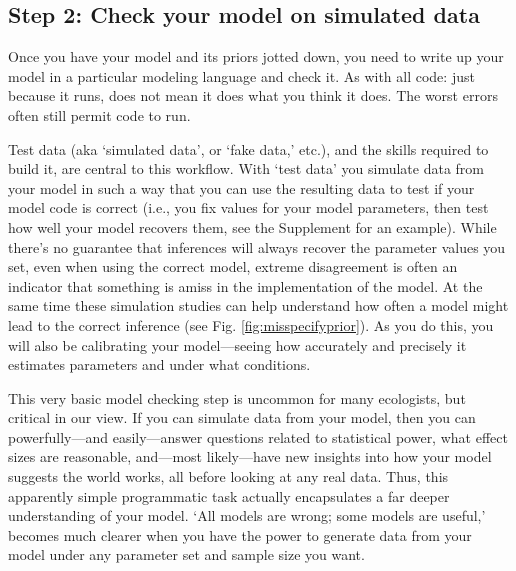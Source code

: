 \documentclass[11pt]{article}
\begin{document}
\subsection*{Step 2: Check your model on simulated data} 

Once you have your model and its priors jotted down, you need to write up your model in a particular modeling language and check it. As with all code: just because it runs, does not mean it does what you think it does. The worst errors often still permit code to run. %

Test data (aka `simulated data', or  `fake data,' etc.), and the skills required to build it, are central to this workflow. With `test data' you simulate data from your model in such a way that you can use the resulting data to test if your model code is correct (i.e., you fix values for your model parameters, then test how well your model recovers them, see the Supplement for an example). While there's no guarantee that inferences will always recover the parameter values you set, even when using the correct model, extreme disagreement is often an indicator that something is amiss in the implementation of the model. At the same time these simulation studies can help understand how often a model might lead to the correct inference (see Fig. \ref{fig:misspecifyprior}). %
As you do this, you will also be calibrating your model---seeing how accurately and precisely it estimates parameters and under what conditions. 

This very basic model checking step is uncommon for many ecologists, but critical in our view. If you can simulate data from your model, then you can powerfully---and easily---answer questions related to statistical power, what effect sizes are reasonable, and---most likely---have new insights into how your model suggests the world works, all before looking at any real data. Thus, this apparently simple programmatic task actually encapsulates a far deeper understanding of your model. `All models are wrong; some models are useful,' becomes much clearer when you have the power to generate data from your model under any parameter set and sample size you want. %
\end{document}
